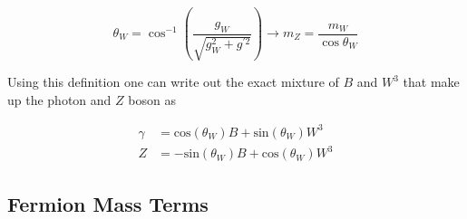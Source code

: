 \begin{equation}
\theta_W = \cos^{-1}\left( \frac{g_{W}}{\sqrt{g_{W}^{2}+g^{'2}}} \right) \rightarrow m_{Z} =
\frac{m_{W}}{\cos{\theta_{W}}}
\end{equation}

Using this definition one can write out the exact mixture of $B$ and $W^{3}$ that
make up the photon and $Z$ boson as

\begin{align}
\gamma &= \text{cos}(\theta_{W})B + \text{sin}(\theta_{W})W^{3} \\
Z &= -\text{sin}(\theta_{W})B + \text{cos}(\theta_{W})W^{3}
\end{align}

\subsection{Fermion Mass Terms} \label{sec:theory:fermion_mass}

